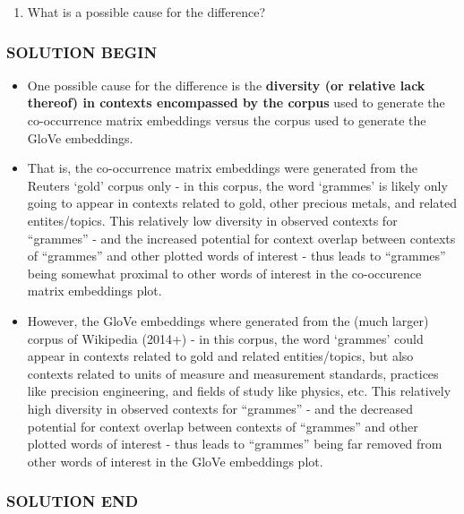 \documentclass[11pt]{article}
\providecommand{\tightlist}{%
      \setlength{\itemsep}{0pt}\setlength{\parskip}{0pt}}
\begin{document}
    \begin{enumerate}
\def\labelenumi{\alph{enumi}.}
\setcounter{enumi}{1}
\tightlist
\item
  What is a possible cause for the difference?
\end{enumerate}

    \hypertarget{solution-begin}{%
\subsubsection{SOLUTION BEGIN}\label{solution-begin}}

\begin{itemize}
\item
  One possible cause for the difference is the \textbf{diversity (or
  relative lack thereof) in contexts encompassed by the corpus} used to
  generate the co-occurrence matrix embeddings versus the corpus used to
  generate the GloVe embeddings.
\item
  That is, the co-occurrence matrix embeddings were generated from the
  Reuters `gold' corpus only - in this corpus, the word `grammes' is
  likely only going to appear in contexts related to gold, other
  precious metals, and related entites/topics. This relatively low
  diversity in observed contexts for ``grammes'' - and the increased
  potential for context overlap between contexts of ``grammes'' and
  other plotted words of interest - thus leads to ``grammes'' being
  somewhat proximal to other words of interest in the co-occurence
  matrix embeddings plot.
\item
  However, the GloVe embeddings where generated from the (much larger)
  corpus of Wikipedia (2014+) - in this corpus, the word `grammes' could
  appear in contexts related to gold and related entities/topics, but
  also contexts related to units of measure and measurement standards,
  practices like precision engineering, and fields of study like
  physics, etc. This relatively high diversity in observed contexts for
  ``grammes'' - and the decreased potential for context overlap between
  contexts of ``grammes'' and other plotted words of interest - thus
  leads to ``grammes'' being far removed from other words of interest in
  the GloVe embeddings plot.
\end{itemize}

\hypertarget{solution-end}{%
\subsubsection{SOLUTION END}\label{solution-end}}
\end{document}
